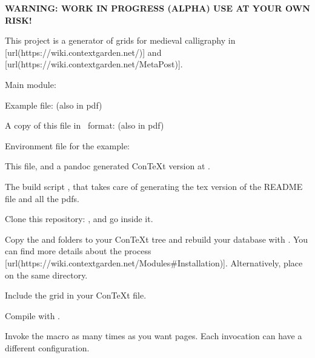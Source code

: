 \startchapter[title={A Calligraphy Grid in ConTeXt/LMTX},reference={a-calligraphy-grid-in-contextlmtx}]

{\bf WARNING: WORK IN PROGRESS (ALPHA) USE AT YOUR OWN RISK!}

This project is a generator of grids for medieval calligraphy in [url(https://wiki.contextgarden.net/)] and [url(https://wiki.contextgarden.net/MetaPost)].

\startsection[title={Files included},reference={files-included}]

\startitemize[packed]
\item
  Main module: 
\item
  Example file:  (also in pdf)
\item
  A copy of this file in \CONTEXT~format:  (also in pdf)
\item
  Environment file for the example: 
\item
  This  file, and a pandoc generated ConTeXt version at .
\item
  The build script , that takes care of generating the tex version of the README file and all the pdfs.
\stopitemize

\stopsection

\startsection[title={Use},reference={use}]

\startenumerate[n,packed][stopper=.]
\item
  Clone this repository: , and go inside it.
\item
  Copy the  and  folders to your ConTeXt tree and rebuild your database with . You can find more details about the process [url(https://wiki.contextgarden.net/Modules\#Installation)]. Alternatively, place  on the same directory.
\item
  Include the grid in your ConTeXt file.
\item
  Compile with .
\item
  Invoke the \type{\Pauta} macro as many times as you want pages. Each invocation can have a different configuration.
\stopenumerate

\stopsection

